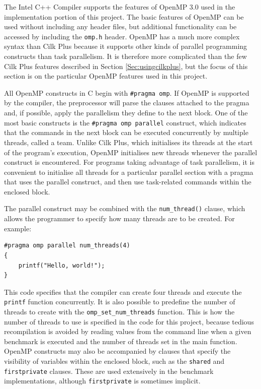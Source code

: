 \documentclass{report}
\newenvironment{mono}{\fontfamily{ttfamily}\selectfont}{\par}
\newenvironment{embedcode}{\begin{changemargin}{6em}{3em}\begin{mono}{}}{\end{mono}\end{changemargin}}
\begin{document}
The Intel C++ Compiler supports the features of OpenMP 3.0 used in the implementation portion of this project. The basic features of OpenMP can be used without including any header files, but additional functionality can be accessed by including the \verb!omp.h! header\cite{Jeffers13}. OpenMP has a much more complex syntax than Cilk Plus because it supports other kinds of parallel programming constructs than task parallelism\cite{openmpspec}. It is therefore more complicated than the few Cilk Plus features described in Section \ref{Sec:usingcilkplus}, but the focus of this section is on the particular OpenMP features used in this project. 

All OpenMP constructs in C begin with \verb!#pragma omp!. If OpenMP is supported by the compiler, the preprocessor will parse the clauses attached to the pragma and, if possible, apply the parallelism they define to the next block. One of the most basic constructs is the \verb!#pragma omp parallel! construct, which indicates that the commands in the next block can be executed concurrently by multiple threads, called a team\cite{openmpspec}. Unlike Cilk Plus, which initialises its threads at the start of the program's execution, OpenMP initialises new threads whenever the parallel construct is encountered. For programs taking advantage of task parallelism, it is convenient to initialise all threads for a particular parallel section with a pragma that uses the parallel construct, and then use task-related commands within the enclosed block.

The parallel construct may be combined with the \verb!num_thread()! clause, which allows the programmer to specify how many threads are to be created. For example:

\begin{embedcode}
\begin{verbatim}
#pragma omp parallel num_threads(4)
{
    printf("Hello, world!");
}
\end{verbatim}
\end{embedcode}

This code specifies that the compiler can create four threads and execute the \verb!printf! function concurrently. It is also possible to predefine the number of threads to create with the \verb!omp_set_num_threads! function. This is how the number of threads to use is specified in the code for this project, because tedious recompilation is avoided by reading values from the command line when a given benchmark is executed and the number of threads set in the main function. OpenMP constructs may also be accompanied by clauses that specify the visibility of variables within the enclosed block, such as the \verb!shared! and \verb!firstprivate! clauses. These are used extensively in the benchmark implementations, although \verb!firstprivate! is sometimes implicit\cite{openmpspec}.
\end{document}
